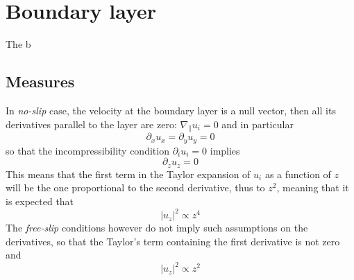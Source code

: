 \section{Boundary layer}
The b%

\subsection{Measures}
In \textit{no-slip} case, the velocity at the boundary layer is a null vector, then all its derivatives parallel to the layer are zero: \( \nabla_\parallel u_i = 0 \) and in particular 
\[ \partial_x u_x = \partial_y u_y =0 \]
so that the incompressibility condition \(\partial_i u_i = 0\) implies 
\[ \partial_z u_z = 0 \]
This means that the first term in the Taylor expansion of $u_i$ as a function of $z$ will be the one proportional to the second derivative, thus to $z^2$, meaning that it is expected that
\[ |u_z|^2 \propto z^4 \]
The \textit{free-slip} conditions however do not imply such assumptions on the derivatives, so that the Taylor's term containing the first derivative is not zero and 
\[ |u_z|^2 \propto z^2 \]